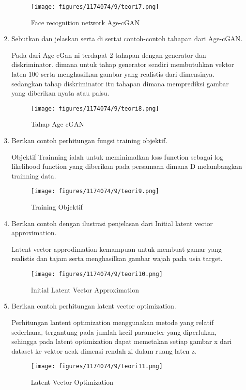 \begin{enumerate}
	\begin{figure}[H]
		\texttt{[image: figures/1174074/9/teori7.png]}
            	\centering
           	 \caption{Face recognition network Age-cGAN}
       	 \end{figure}

        \item Sebutkan dan jelaskan serta di sertai contoh-contoh tahapan dari Age-cGAN.

Pada dari Age-cGan ni terdapat 2 tahapan dengan generator dan diskriminator. dimana untuk tahap generator sendiri membutuhkan vektor laten 100 serta menghasilkan gambar yang realistis dari dimensinya. sedangkan tahap diskriminator itu tahapan dimana memprediksi gambar yang diberikan nyata atau palsu.

	\begin{figure}[H]
		\texttt{[image: figures/1174074/9/teori8.png]}
            	\centering
           	 \caption{Tahap Age cGAN}
       	 \end{figure}

        \item Berikan contoh perhitungan fungsi training objektif.

Objektif Trainning ialah untuk meminimalkan loss function sebagai log likelihood function yang diberikan pada persamaan dimana D melambangkan trainning data.

	\begin{figure}[H]
		\texttt{[image: figures/1174074/9/teori9.png]}
            	\centering
           	 \caption{Training Objektif}
       	 \end{figure}

        \item Berikan contoh dengan ilustrasi penjelasan dari Initial latent vector approximation.

Latent vector approdimation kemampuan untuk membuat gamar yang realistis dan tajam serta menghasilkan gambar wajah pada usia target.

	\begin{figure}[H]
		\texttt{[image: figures/1174074/9/teori10.png]}
            	\centering
           	 \caption{Initial Latent Vector Approximation}
       	 \end{figure}

        \item Berikan contoh perhitungan latent vector optimization.

Perhitungan lantent optimization menggunakan metode yang relatif sederhana, tergantung pada jumlah kecil parameter yang diperlukan, sehingga pada latent optimization dapat memetakan setiap gambar x dari dataset ke vektor acak dimensi rendah zi dalam ruang laten z.

	\begin{figure}[H]
		\texttt{[image: figures/1174074/9/teori11.png]}
            	\centering
           	 \caption{Latent Vector Optimization}
       	 \end{figure}

\end{enumerate}


